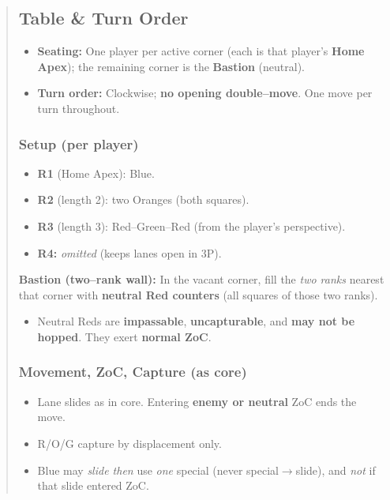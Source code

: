 \documentclass[11pt]{article}
\begin{document}
\begin{quote}
\subsection*{Table \& Turn Order}
\begin{itemize}[leftmargin=1.3em,itemsep=0.25em]
  \item \textbf{Seating:} One player per active corner (each is that player’s \textbf{Home Apex}); the remaining corner is the \textbf{Bastion} (neutral).
  \item \textbf{Turn order:} Clockwise; \textbf{no opening double–move}. One move per turn throughout.
\end{itemize}

\subsubsection*{Setup (per player)}
\begin{itemize}[leftmargin=1.3em,itemsep=0.25em]
  \item \textbf{R1} (Home Apex): Blue.
  \item \textbf{R2} (length 2): two Oranges (both squares).
  \item \textbf{R3} (length 3): Red–Green–Red (from the player’s perspective).
  \item \textbf{R4:} \emph{omitted} (keeps lanes open in 3P).
\end{itemize}
\noindent \textbf{Bastion (two–rank wall):} In the vacant corner, fill the \emph{two ranks} nearest that corner with \textbf{neutral Red counters} (all squares of those two ranks).
\begin{itemize}[leftmargin=1.3em,itemsep=0.25em]
  \item Neutral Reds are \textbf{impassable}, \textbf{uncapturable}, and \textbf{may not be hopped}. They exert \textbf{normal ZoC}.
\end{itemize}

\subsubsection*{Movement, ZoC, Capture (as core)}
\begin{itemize}[leftmargin=1.3em,itemsep=0.25em]
  \item Lane slides as in core. Entering \textbf{enemy or neutral} ZoC ends the move. 
  \item R/O/G capture by displacement only.
  \item Blue may \emph{slide then} use \emph{one} special (never special$\to$slide), and \emph{not} if that slide entered ZoC.
\end{itemize}


\end{quote}
\end{document}

